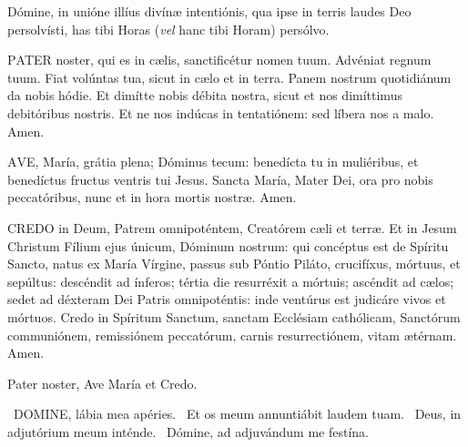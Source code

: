 Dómine, in unióne illíus divínæ intentiónis, qua ipse in terris laudes Deo persolvísti, has tibi Horas (\textit{vel} hanc tibi Horam) persólvo.


\sectionornament
\label{p:2}



\lettrine[lines=2]{P}{ATER} noster, qui es in cælis, sanctificétur nomen tuum. Advéniat regnum tuum. Fiat volúntas tua, sicut in cælo et in terra. Panem nostrum quotidiánum da nobis hódie. Et dimítte nobis débita nostra, sicut et nos dimíttimus debitóribus nostris. Et ne nos indúcas in tentatiónem: sed líbera nos a malo. Amen.

\lettrine[lines=2]{A}{VE}, María, grátia plena; Dóminus tecum: benedícta tu in muliéribus, et benedíctus fructus ventris tui Jesus. Sancta María, Mater Dei, ora pro nobis peccatóribus, nunc et in hora mortis nostræ. Amen.


\lettrine[lines=2]{C}{REDO} in Deum, Patrem omnipoténtem, Creatórem cæli et terræ. Et in Jesum Christum Fílium ejus únicum, Dóminum nostrum: qui concéptus est de Spíritu Sancto, natus ex María Vírgine, passus sub Póntio Piláto, crucifíxus, mórtuus, et sepúltus: descéndit ad ínferos; tértia die resurréxit a mórtuis; ascéndit ad cælos; sedet ad déxteram Dei Patris omnipoténtis: inde ventúrus est judicáre vivos et mórtuos. Credo in Spíritum Sanctum, sanctam Ecclésiam cathólicam, Sanctórum communiónem, remissiónem peccatórum, carnis resurrectiónem, vitam ætérnam. Amen.


\sectionornament
\label{p:3}


Pater noster, Ave María et Credo.


\V\ \lettrine[lines=2]{D}{OMINE}, lábia mea apéries. \R\ Et os meum annuntiábit laudem tuam. \V\ Deus, in adjutórium meum inténde. \R\ Dómine, ad adjuvándum me festína.

